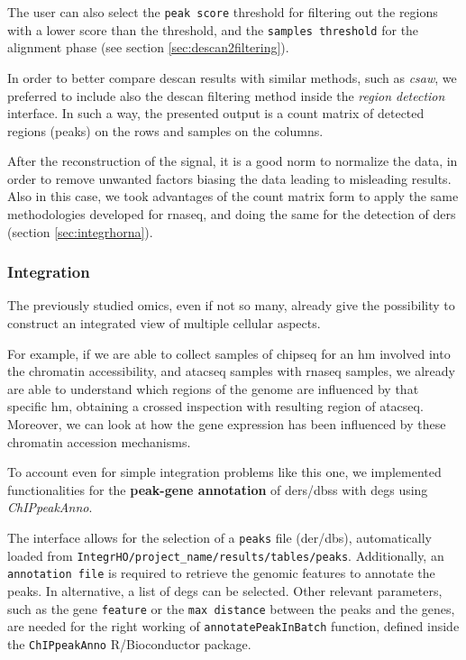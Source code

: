The user can also select the \lstinline!peak score! threshold for filtering out the regions with a lower score than the threshold, and the \lstinline!samples threshold! for the alignment phase (see section \ref{sec:descan2filtering}).

In order to better compare \gls{descan} results with similar methods, such as \textit{csaw}, we preferred to include also the \gls{descan} filtering method inside the \textit{region detection} interface.
In such a way, the presented output is a count matrix of detected regions (peaks) on the rows and samples on the columns.

After the reconstruction of the signal, it is a good norm to normalize the data, in order to remove unwanted factors biasing the data leading to misleading results.
Also in this case, we took advantages of the count matrix form to apply the same methodologies developed for \gls{rnaseq}, and doing the same for the detection of \glspl{der} (section \ref{sec:integrhorna}).

\subsubsection{Integration} \label{sec:integrhointegration}
The previously studied omics, even if not so many, already give the possibility to construct an integrated view of multiple cellular aspects.

For example, if we are able to collect samples of \gls{chipseq} for an \gls{hm} involved into the chromatin accessibility, and \gls{atacseq} samples with \gls{rnaseq} samples, we already are able to understand which regions of the genome are influenced by that  specific \gls{hm}, obtaining a crossed inspection with resulting region of \gls{atacseq}.
Moreover, we can look at how the gene expression has been influenced by these chromatin accession mechanisms.

To account even for simple integration problems like this one, we implemented functionalities for the \textbf{peak-gene annotation} of \glspl{der}/\glspl{dbs} with \glspl{deg} using \textit{ChIPpeakAnno}.

The interface allows for the selection of a \lstinline!peaks! file (\gls{der}/\gls{dbs}), automatically loaded from  \lstinline!IntegrHO/project_name/results/tables/peaks!.
Additionally, an \lstinline!annotation file! is required to retrieve the genomic features to annotate the peaks.
In alternative, a list of \glspl{deg} can be selected.
Other relevant parameters, such as the gene \lstinline!feature!  or the \lstinline!max distance! between the peaks and the genes, are needed for the right working of \lstinline!annotatePeakInBatch! function, defined inside the \lstinline!ChIPpeakAnno! R/Bioconductor package.

